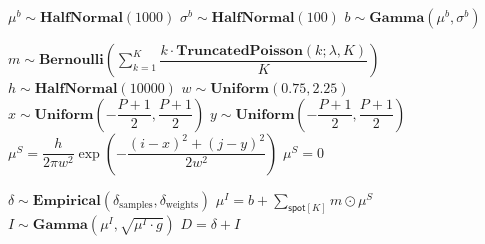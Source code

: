 \begin{algorithm}                     
\begin{algorithmic} [1]
    \State $\mu^b \sim \mathbf{HalfNormal}(1000)$
    \State $\sigma^b \sim \mathbf{HalfNormal}(100)$
        \State $b \sim \mathbf{Gamma}(\mu^b, \sigma^b)$
        
            \State $ m
                \sim \mathbf{Bernoulli} \left( \sum_{k=1}^K \dfrac{k \cdot \mathbf{TruncatedPoisson}(k; \lambda, K)}{K} \right) $
                \State $h \sim \textbf{HalfNormal}(10000)$
                \State $w \sim \textbf{Uniform}(0.75, 2.25)$
                \State $ x \sim \mathbf{Uniform}\left(-\dfrac{P+1}{2}, \dfrac{P+1}{2} \right) $
                \State $ y \sim \mathbf{Uniform}\left(-\dfrac{P+1}{2}, \dfrac{P+1}{2} \right) $
                \State $\mu^{S} =
                            \dfrac{h}{2 \pi w^2} \exp{\left ( -\dfrac{(i-x)^2 + (j-y)^2}{2w^2} \right)}$
                \EndFor
                \State $\mu^S = 0$
            \EndIf
        \EndFor
            
            \State $\delta \sim \mathbf{Empirical}( \delta_\mathrm{samples}, \delta_\mathrm{weights})$
            \State $\mu^I = b + \sum_{\mathsf{spot}[K]} m \odot \mu^S$
            \State $I \sim \mathbf{Gamma} (\mu^I, \sqrt{\mu^I \cdot g})$
            \State \Return $D = \delta + I$
        \EndFor
    \EndFor
\EndFor
\end{algorithmic}
\end{algorithm}